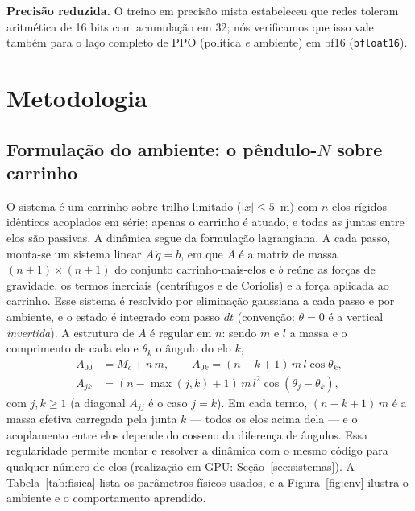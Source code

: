 \documentclass[12pt]{article}
\begin{document}
\textbf{Precisão reduzida.} O treino em precisão mista
\cite{micikevicius2018} estabeleceu que redes toleram aritmética de 16 bits com
acumulação em 32; nós verificamos que isso vale também para o laço completo de
PPO (política \emph{e} ambiente) em bf16 (\texttt{bfloat16}).

\section{Metodologia}\label{sec:metodo}

\subsection{Formulação do ambiente: o pêndulo-$N$ sobre carrinho}\label{sec:env}

O sistema é um carrinho sobre trilho limitado ($|x| \leq 5$~m) com $n$ elos
rígidos idênticos acoplados em série; apenas o carrinho é atuado, e todas as
juntas entre elos são passivas. A dinâmica segue da formulação lagrangiana. A
cada passo, monta-se um sistema linear $A\,\ddot{q} = b$, em que $A$ é a matriz
de massa $(n{+}1)\times(n{+}1)$ do conjunto carrinho-mais-elos e $b$ reúne as
forças de gravidade, os termos inerciais (centrífugos e de Coriolis) e a força
aplicada ao carrinho. Esse sistema é resolvido por eliminação gaussiana a cada
passo e por ambiente, e o estado é integrado com passo $dt$ (convenção:
$\theta{=}0$ é a vertical \emph{invertida}). A estrutura de $A$ é regular em
$n$: sendo $m$ e $l$ a massa e o comprimento de cada elo e $\theta_k$ o ângulo
do elo $k$,
\begin{equation}
\begin{aligned}
A_{00} &= M_c + n\,m, \qquad
A_{0k} = (n{-}k{+}1)\,m\,l\cos\theta_k,\\
A_{jk} &= (n{-}\max(j,k){+}1)\,m\,l^2\cos(\theta_j{-}\theta_k),
\end{aligned}
\label{eq:massmatrix}
\end{equation}
com $j,k \geq 1$ (a diagonal $A_{jj}$ é o caso $j{=}k$). Em cada termo,
$(n{-}k{+}1)\,m$ é a massa efetiva carregada pela junta $k$ --- todos os elos
acima dela --- e o acoplamento entre elos depende do cosseno da diferença de
ângulos. Essa regularidade permite montar e resolver a dinâmica com o mesmo
código para qualquer número de elos (realização em GPU:
Seção~\ref{sec:sistemas}). A Tabela~\ref{tab:fisica} lista os parâmetros
físicos usados, e a Figura~\ref{fig:env} ilustra o ambiente e o comportamento
aprendido.
\end{document}

